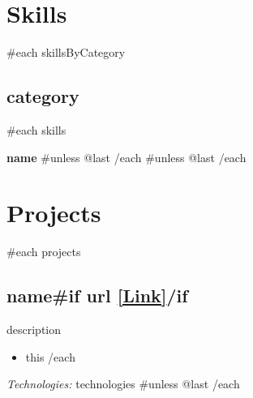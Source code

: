 \documentclass[11pt,letterpaper]{article}
\newcommand{\skill}[1]{
  \textbf{#1}
}
\begin{document}
\section{Skills}
{{#each skillsByCategory}}
\subsection{{{category}}}
{{#each skills}}
\skill{{{name}}}{{#unless @last}} 
{{/each}}
{{#unless @last}}
{{/each}}

\section{Projects}
{{#each projects}}
\subsection{{{name}}{{#if url}} \normalfont\small\textcolor{primary}{\href{{{url}}}{[Link]}}{{/if}}}
{{description}}
\begin{itemize}[leftmargin=*]
  {{#each achievements}}
  \item {{this}}
  {{/each}}
\end{itemize}
\textit{Technologies:} {{technologies}}
{{#unless @last}}
{{/each}}
\end{document}
